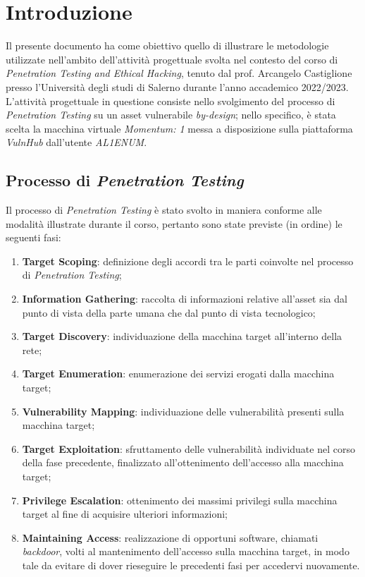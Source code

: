 \chapter{Introduzione}
Il presente documento ha come obiettivo quello di illustrare le metodologie utilizzate nell'ambito dell'attività progettuale svolta nel contesto del corso di \emph{Penetration Testing and Ethical Hacking}, tenuto dal prof. Arcangelo Castiglione presso l'Università degli studi di Salerno durante l'anno accademico 2022/2023. L'attività progettuale in questione consiste nello svolgimento del processo di \emph{Penetration Testing} su un asset vulnerabile \emph{by-design}; nello specifico, è stata scelta la macchina virtuale \emph{Momentum: 1} messa a disposizione sulla piattaforma \emph{VulnHub} dall'utente \emph{AL1ENUM}. 

\section{Processo di \emph{Penetration Testing}}
Il processo di \emph{Penetration Testing} è stato svolto in maniera conforme alle modalità illustrate durante il corso, pertanto sono state previste (in ordine) le seguenti fasi:
\begin{enumerate}
    \item \textbf{Target Scoping}: definizione degli accordi tra le parti coinvolte nel processo di \emph{Penetration Testing};
    \item \textbf{Information Gathering}: raccolta di informazioni relative all'asset sia dal punto di vista della parte umana che dal punto di vista tecnologico;
    \item \textbf{Target Discovery}: individuazione della macchina target all'interno della rete;
    \item \textbf{Target Enumeration}: enumerazione dei servizi erogati dalla macchina target;
    \item \textbf{Vulnerability Mapping}: individuazione delle vulnerabilità presenti sulla macchina target;
    \item \textbf{Target Exploitation}: sfruttamento delle vulnerabilità individuate nel corso della fase precedente, finalizzato all'ottenimento dell'accesso alla macchina target;
    \item \textbf{Privilege Escalation}: ottenimento dei massimi privilegi sulla macchina target al fine di acquisire ulteriori informazioni;
    \item \textbf{Maintaining Access}: realizzazione di opportuni software, chiamati \emph{backdoor}, volti al mantenimento dell'accesso sulla macchina target, in modo tale da evitare di dover rieseguire le precedenti fasi per accedervi nuovamente.
\end{enumerate}

